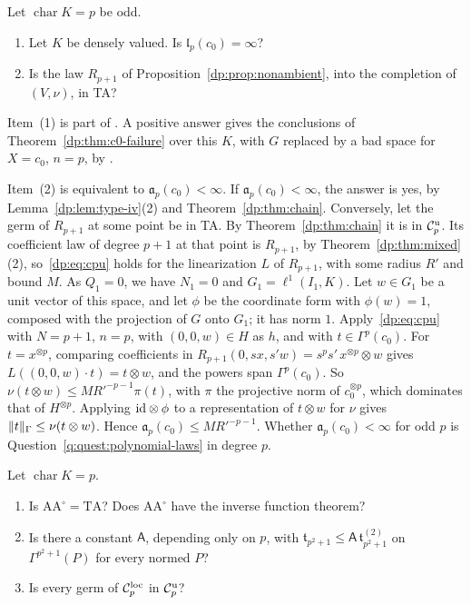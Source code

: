 \begin{question}\label{dp:q:odd-c0}
Let $\operatorname{char}K=p$ be odd.
\begin{enumerate}
\item Let $K$ be densely valued. Is $\mathfrak l_p(c_0)=\infty$?
\item Is the law $R_{p+1}$ of Proposition~\ref{dp:prop:nonambient}, into the completion of $(V,\nu)$, in TA?
\end{enumerate}
\end{question}

Item~(1) is part of \cite[Question~14.42(2)]{I}. A positive answer gives the conclusions of Theorem~\ref{dp:thm:c0-failure} over this $K$, with $G$ replaced by a bad space for $X=c_0$, $n=p$, by \cite[Proposition~14.18]{I}.

Item~(2) is equivalent to $\mathfrak a_p(c_0)<\infty$. If $\mathfrak a_p(c_0)<\infty$, the answer is yes, by Lemma~\ref{dp:lem:type-iv}(2) and Theorem~\ref{dp:thm:chain}. Conversely, let the germ of $R_{p+1}$ at some point be in TA. By Theorem~\ref{dp:thm:chain} it is in $\mathcal{C}_p^{\rm u}$. Its coefficient law of degree $p+1$ at that point is $R_{p+1}$, by Theorem~\ref{dp:thm:mixed}(2), so~\eqref{dp:eq:cpu} holds for the linearization $L$ of $R_{p+1}$, with some radius $R'$ and bound $M$. As $Q_1=0$, we have $N_1=0$ and $G_1=\ell^1(I_1,K)$. Let $w\in G_1$ be a unit vector of this space, and let $\phi$ be the coordinate form with $\phi(w)=1$, composed with the projection of $G$ onto $G_1$; it has norm $1$. Apply~\eqref{dp:eq:cpu} with $N=p+1$, $n=p$, with $(0,0,w)\in H$ as $h$, and with $t\in\Gamma^p(c_0)$. For $t=x^{\otimes p}$, comparing coefficients in $R_{p+1}(0,sx,s'w)=s^ps'\,x^{\otimes p}\otimes w$ gives $L((0,0,w)\cdot t)=t\otimes w$, and the powers span $\Gamma^p(c_0)$. So $\nu(t\otimes w)\le MR'^{-p-1}\pi(t)$, with $\pi$ the projective norm of $c_0^{\otimes p}$, which dominates that of $H^{\otimes p}$. Applying $\mathrm{id}\otimes\phi$ to a representation of $t\otimes w$ for $\nu$ gives $\lVert t\rVert_\Gamma\le\nu(t\otimes w)$. Hence $\mathfrak a_p(c_0)\le MR'^{-p-1}$. Whether $\mathfrak a_p(c_0)<\infty$ for odd $p$ is Question~\ref{q:quest:polynomial-laws} in degree $p$.

\begin{question}\label{dp:q:ta}
Let $\operatorname{char}K=p$.
\begin{enumerate}
\item Is $\mathrm{AA}^\circ=\mathrm{TA}$? Does $\mathrm{AA}^\circ$ have the inverse function theorem?
\item Is there a constant $\mathsf A$, depending only on $p$, with $\mathfrak t_{p^2+1}\le\mathsf A\,\mathfrak t^{(2)}_{p^2+1}$ on $\Gamma^{p^2+1}(P)$ for every normed $P$?
\item Is every germ of $\mathcal{C}_p^{\rm loc}$ in $\mathcal{C}_p^{\rm u}$?
\end{enumerate}
\end{question}

